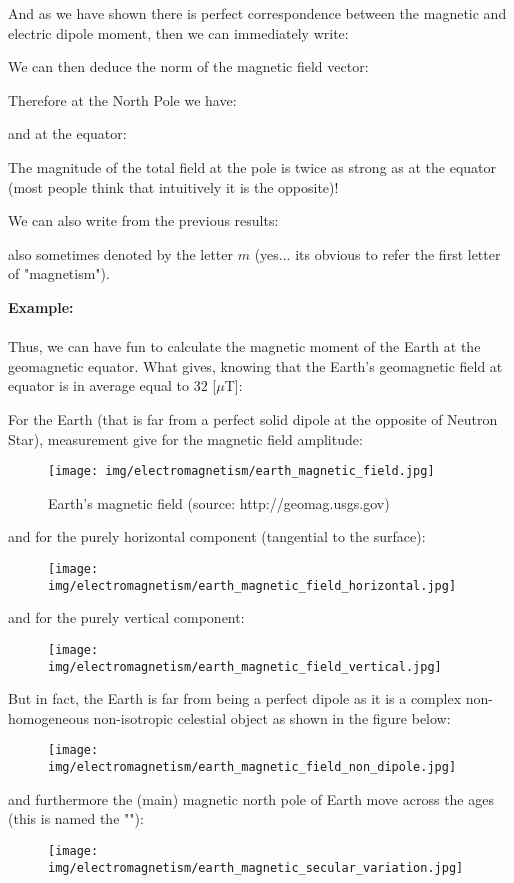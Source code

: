 	And as we have shown there is perfect correspondence between the magnetic and electric dipole moment, then we can immediately write:
	
	We can then deduce the norm of the magnetic field vector:
	
	Therefore at the North Pole we have:
	
	and at the equator:
	
	The magnitude of the total field at the pole is twice as strong as at the equator (most people think that intuitively it is the opposite)!
	
	We can also write from the previous results:
	
	also sometimes denoted by the letter $m$ (yes... its obvious to refer the first letter of "magnetism").
	
	\begin{tcolorbox}[colframe=black,colback=white,sharp corners]
	\textbf{{\Large {}}Example:}\\\\
	Thus, we can have fun to calculate the magnetic moment of the Earth at the geomagnetic equator. What gives, knowing that the Earth's geomagnetic field  at equator is in average equal to $32$ [$\mu$T]:
	
	\end{tcolorbox}
	For the Earth (that is far from a perfect solid dipole at the opposite of Neutron Star), measurement give for the magnetic field amplitude:
	\begin{figure}[H]
		\centering
		\texttt{[image: img/electromagnetism/earth\_magnetic\_field.jpg]}
		\caption[Earth's magnetic field]{Earth's magnetic field (source: http://geomag.usgs.gov)}
	\end{figure}
	and for the purely horizontal component (tangential to the surface):
	\begin{figure}[H]
		\centering
		\texttt{[image: img/electromagnetism/earth\_magnetic\_field\_horizontal.jpg]}
	\end{figure}
	and for the purely vertical component:
	\begin{figure}[H]
		\centering
		\texttt{[image: img/electromagnetism/earth\_magnetic\_field\_vertical.jpg]}
	\end{figure}
	But in fact, the Earth is far from being a perfect dipole as it is a complex non-homogeneous non-isotropic celestial object as shown in the figure below:
	\begin{figure}[H]
		\centering
		\texttt{[image: img/electromagnetism/earth\_magnetic\_field\_non\_dipole.jpg]}
	\end{figure}
	and furthermore the (main) magnetic north pole of Earth move across the ages (this is named the ""):
	\begin{figure}[H]
		\centering
		\texttt{[image: img/electromagnetism/earth\_magnetic\_secular\_variation.jpg]}
	\end{figure}
	
